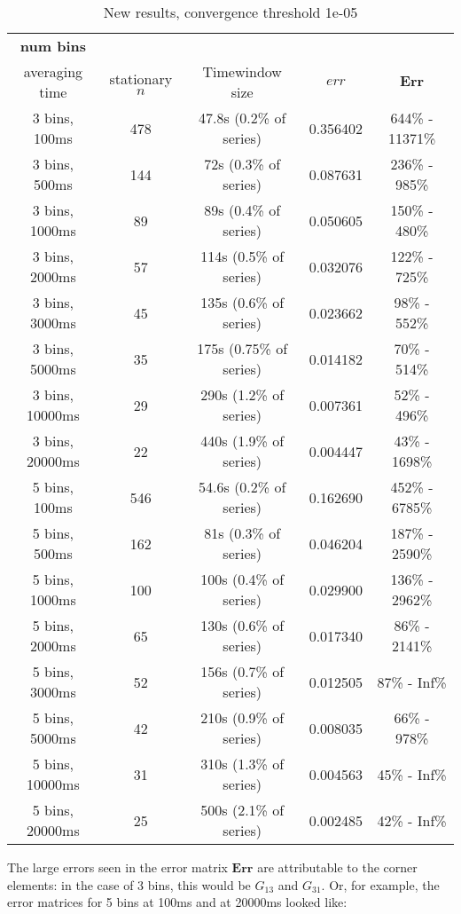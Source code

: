 \documentclass[12pt]{article}
\newcommand\mat[1]{\boldsymbol{#1}}
\begin{document}
\begin{table}[H]
\small
\centering
\caption{New results, convergence threshold 1e-05}
\vspace*{2.5mm}
\begin{tabular}{c|c|c|c|c}
\hline
\bf num bins & & & & \\ averaging time & stationary $n$ & Timewindow size & $err$ & $\mat{Err}$ \\
\hline\hline
3 bins, 100ms & 478 & 47.8s (0.2\% of series) & 0.356402 & 644\% - 11371\% \\
\hline
3 bins, 500ms & 144 & 72s (0.3\% of series) & 0.087631 & 236\% - 985\% \\
\hline
3 bins, 1000ms & 89 & 89s (0.4\% of series) &  0.050605 & 150\% - 480\% \\
\hline
3 bins, 2000ms & 57 & 114s (0.5\% of series) & 0.032076 & 122\% - 725\% \\
\hline
3 bins, 3000ms & 45 & 135s (0.6\% of series) & 0.023662 & 98\% - 552\% \\
\hline
3 bins, 5000ms & 35 & 175s (0.75\% of series) & 0.014182 & 70\% - 514\% \\
\hline
3 bins, 10000ms & 29 & 290s (1.2\% of series) & 0.007361 & 52\% - 496\% \\
\hline
3 bins, 20000ms & 22 & 440s (1.9\% of series) & 0.004447 & 43\% - 1698\% \\
\hline
\hline
5 bins, 100ms & 546 & 54.6s (0.2\% of series) & 0.162690 & 452\% - 6785\% \\
\hline
5 bins, 500ms & 162 & 81s (0.3\% of series) &  0.046204 & 187\% - 2590\% \\
\hline
5 bins, 1000ms & 100 & 100s (0.4\% of series) & 0.029900 & 136\% - 2962\% \\
\hline
5 bins, 2000ms & 65 & 130s (0.6\% of series)  & 0.017340 & 86\% - 2141\% \\
\hline
5 bins, 3000ms & 52 & 156s (0.7\% of series) &  0.012505 & 87\% - Inf\% \\
\hline
5 bins, 5000ms & 42 & 210s (0.9\% of series) & 0.008035 & 66\% - 978\% \\
\hline
5 bins, 10000ms & 31 & 310s (1.3\% of series) & 0.004563 & 45\% - Inf\% \\
\hline
5 bins, 20000ms & 25 & 500s (2.1\% of series) & 0.002485 & 42\% - Inf\% \\
\hline
\end{tabular}
\end{table}

The large errors seen in the error matrix $\mat{Err}$ are attributable to the corner elements: in the case of 3 bins, this would be $G_{13}$ and $G_{31}$. Or, for example, the error matrices for 5 bins at 100ms and at 20000ms looked like:
\end{document}
